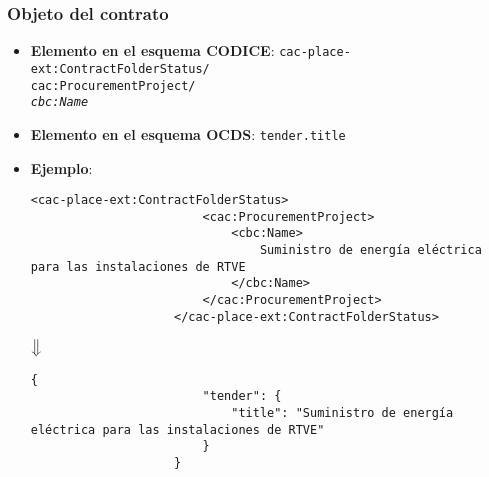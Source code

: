         \subsubsection{Objeto del contrato}
        \begin{itemize}
            \item \textbf{Elemento en el esquema CODICE}:
                \tabto{7.6cm} \texttt{cac-place-ext:ContractFolderStatus/} \\
                \tabto{7.6cm} \texttt{cac:ProcurementProject/} \\
                \tabto{7.6cm} \texttt{\textit{cbc:Name}}
            \item \textbf{Elemento en el esquema OCDS}:
                \tabto{7.6cm} \texttt{tender.title}
            \item \textbf{Ejemplo}: \\
                \begin{lstlisting}[language=lXML]
                    <cac-place-ext:ContractFolderStatus>
                        <cac:ProcurementProject>
                            <cbc:Name>
                                Suministro de energía eléctrica para las instalaciones de RTVE
                            </cbc:Name>
                        </cac:ProcurementProject>
                    </cac-place-ext:ContractFolderStatus>
                \end{lstlisting}
                
                \begin{center}
                    $\big\Downarrow$
                \end{center}
                
                \begin{lstlisting}[language=lJSON]
                    {
                        "tender": {
                            "title": "Suministro de energía eléctrica para las instalaciones de RTVE"
                        }
                    }
                \end{lstlisting}
        \end{itemize}
        
